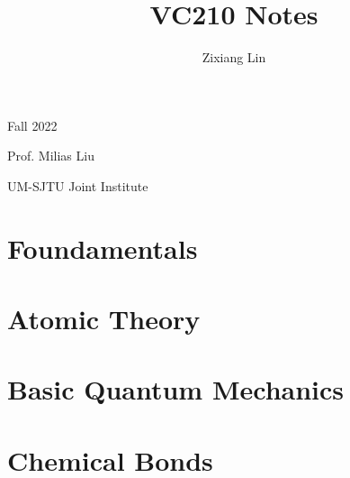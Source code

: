 \documentclass[a4paper,12pt]{article}
\begin{document}
\title{\huge VC210 Notes} %
\author{Zixiang Lin}

\maketitle %
\thispagestyle{fancy}

\begin{center}

\large Fall 2022\par
\large Prof. Milias Liu\par
\large UM-SJTU Joint Institute
\end{center}

\newpage

\tableofcontents

\newpage



\newpage
\section{Foundamentals}

\newpage
\section{Atomic Theory}

\newpage
\section{Basic Quantum Mechanics}

\newpage
\section{Chemical Bonds}
\end{document}
